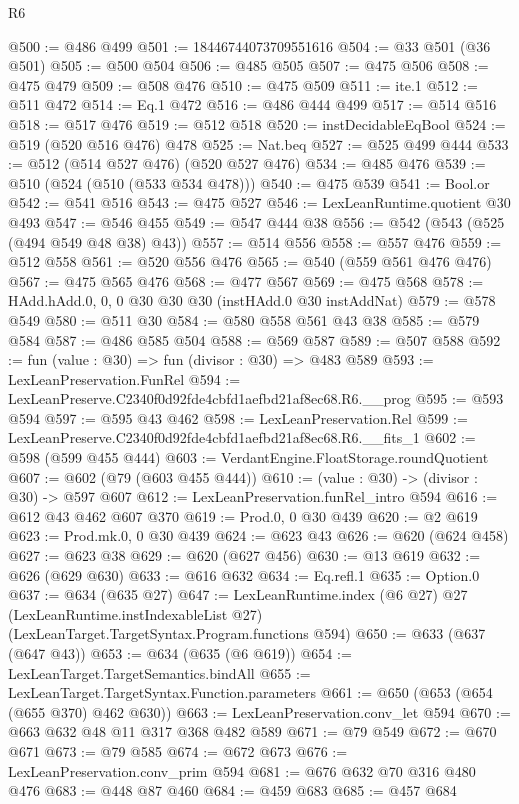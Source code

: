 \begin{lexlean}{R6}
\begin{coremodule}
@500 := @486 @499
@501 := 18446744073709551616
@504 := @33 @501 (@36 @501)
@505 := @500 @504
@506 := @485 @505
@507 := @475 @506
@508 := @475 @479
@509 := @508 @476
@510 := @475 @509
@511 := ite.{1}
@512 := @511 @472
@514 := Eq.{1} @472
@516 := @486 @444 @499
@517 := @514 @516
@518 := @517 @476
@519 := @512 @518
@520 := instDecidableEqBool
@524 := @519 (@520 @516 @476) @478
@525 := Nat.beq
@527 := @525 @499 @444
@533 := @512 (@514 @527 @476) (@520 @527 @476)
@534 := @485 @476
@539 := @510 (@524 (@510 (@533 @534 @478)))
@540 := @475 @539
@541 := Bool.or
@542 := @541 @516
@543 := @475 @527
@546 := LexLeanRuntime.quotient @30 @493
@547 := @546 @455
@549 := @547 @444 @38
@556 := @542 (@543 (@525 (@494 @549 @48 @38) @43))
@557 := @514 @556
@558 := @557 @476
@559 := @512 @558
@561 := @520 @556 @476
@565 := @540 (@559 @561 @476 @476)
@567 := @475 @565 @476
@568 := @477 @567
@569 := @475 @568
@578 := HAdd.hAdd.{0, 0, 0} @30 @30 @30 (instHAdd.{0} @30 instAddNat)
@579 := @578 @549
@580 := @511 @30
@584 := @580 @558 @561 @43 @38
@585 := @579 @584
@587 := @486 @585 @504
@588 := @569 @587
@589 := @507 @588
@592 := fun (value : @30) => fun (divisor : @30) => @483 @589
@593 := LexLeanPreservation.FunRel
@594 := LexLeanPreserve.C2340f0d92fde4cbfd1aefbd21af8ec68.R6.__prog
@595 := @593 @594
@597 := @595 @43 @462
@598 := LexLeanPreservation.Rel
@599 := LexLeanPreserve.C2340f0d92fde4cbfd1aefbd21af8ec68.R6.__fits_1
@602 := @598 (@599 @455 @444)
@603 := VerdantEngine.FloatStorage.roundQuotient
@607 := @602 (@79 (@603 @455 @444))
@610 := (value : @30) -> (divisor : @30) -> @597 @607
@612 := LexLeanPreservation.funRel_intro @594
@616 := @612 @43 @462 @607 @370
@619 := Prod.{0, 0} @30 @439
@620 := @2 @619
@623 := Prod.mk.{0, 0} @30 @439
@624 := @623 @43
@626 := @620 (@624 @458)
@627 := @623 @38
@629 := @620 (@627 @456)
@630 := @13 @619
@632 := @626 (@629 @630)
@633 := @616 @632
@634 := Eq.refl.{1}
@635 := Option.{0}
@637 := @634 (@635 @27)
@647 := LexLeanRuntime.index
    (@6 @27)
    @27
    (LexLeanRuntime.instIndexableList @27)
    (LexLeanTarget.TargetSyntax.Program.functions @594)
@650 := @633 (@637 (@647 @43))
@653 := @634 (@635 (@6 @619))
@654 := LexLeanTarget.TargetSemantics.bindAll
@655 := LexLeanTarget.TargetSyntax.Function.parameters
@661 := @650 (@653 (@654 (@655 @370) @462 @630))
@663 := LexLeanPreservation.conv_let @594
@670 := @663 @632 @48 @11 @317 @368 @482 @589
@671 := @79 @549
@672 := @670 @671
@673 := @79 @585
@674 := @672 @673
@676 := LexLeanPreservation.conv_prim @594
@681 := @676 @632 @70 @316 @480 @476
@683 := @448 @87 @460
@684 := @459 @683
@685 := @457 @684

\end{coremodule}
\end{lexlean}
